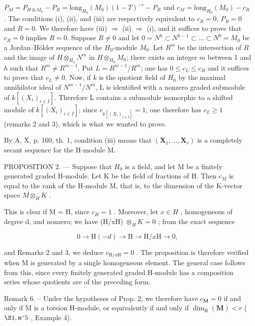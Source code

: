 \(P_{M} = P_{H \otimes M_{0}} - P_{R} = \text{long}_{H_{0}}(M_{0})(1 - T)^{-r} - P_{R}\) and \(c_{M} = \text{long}_{H_{0}}(M_{0}) - c_{R}\). The conditions (i), (ii), and (iii) are respectively equivalent to \(c_{R} = 0\), \(P_{R} = 0\) and \(R = 0\). We therefore have (iii) \(\Rightarrow\) (ii) \(\Rightarrow\) (i), and it suffices to prove that \(c_{R} = 0\) implies \(R = 0\). Suppose \(R \neq 0\) and let \(0 = N^{h} \subset N^{h-1} \subset \ldots \subset N^{0} = M_{0}\) be a Jordan–Hölder sequence of the \(H_{0}\)-module \(M_{0}\). Let \(R^{m}\) be the intersection of \(R\) and the image of \(H \otimes_{H_{0}} N^{m}\) in \(H \otimes_{H_{0}} M_{0}\); there exists an integer \(m\) between 1 and \(h\) such that \(R^{m} \neq R^{m-1}\). Put \(L = R^{m-1}/R^{m}\); one has \(0 \leqslant c_{L} \leqslant c_{R}\) and it suffices to prove that \(c_{L} \neq 0\). Now, if \(k\) is the quotient field of \(H_{0}\) by the maximal annihilator ideal of \(N^{m-1}/N^{m}\), L is identified with a nonzero graded submodule of \(k[(X_{i})_{i\in I}]\). Therefore L contains a submodule isomorphic to a shifted module of \(k[(X_{i})_{i\in I}]\); since \(c_{k[(X_{i})_{i\in I}]} = 1\), one therefore has \(c_{L} \geqslant 1\) (remarks 2 and 3), which is what we wanted to prove.

By A, X, p. 160, th. 1, condition (iii) means that \((\mathbf{X}_{1}, \ldots, \mathbf{X}_{r})\) is a completely secant sequence for the H-module M.

PROPOSITION 2. --- Suppose that \(H_{0}\) is a field, and let M be a finitely generated graded H-module. Let K be the field of fractions of H. Then \(c_{M}\) is equal to the rank of the H-module M, that is, to the dimension of the K-vector space \(M \otimes_{H} K\) .

This is clear if M = H, since \(c_{H} = 1\) . Moreover, let \(x \in H\) , homogeneous of degree d, and nonzero; we have (H/xH) \(\otimes_{H} K = 0\) ; from the exact sequence

\[
0 \rightarrow \mathrm{H} (- d) \rightarrow \mathrm{H} \rightarrow \mathrm{H} / x \mathrm{H} \rightarrow 0,
\]

and Remarks 2 and 3, we deduce \(c_{\mathrm{H}/x\mathrm{H}}=0\) . The proposition is therefore verified when M is generated by a single homogeneous element. The general case follows from this, since every finitely generated graded H-module has a composition series whose quotients are of the preceding form.

Remark 6. -- Under the hypotheses of Prop. 2, we therefore have \(c_{\mathbf{M}} = 0\) if and only if M is a torsion H-module, or equivalently if and only if \(\dim_{\mathrm{H}}(\mathbf{M}) < r\) ( \(\S 1, \mathfrak{n}^{\circ} 5\) , Example 4).

